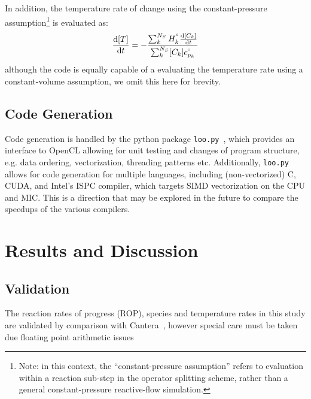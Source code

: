 \documentclass[12pt]{ussci}
\begin{document}
In addition, the temperature rate of change using the constant-pressure assumption\footnote{Note: in this context, the ``constant-pressure assumption'' refers to evaluation within a reaction sub-step in the operator splitting scheme, rather than a general constant-pressure reactive-flow simulation.} is evaluated as:
\begin{equation}
\frac{\text{d}[T]}{\text{d}t} = -\frac{\sum_{k}^{N_S} H^{\degree}_k \frac{\text{d}[C_k]}{\text{d}t}}{\sum_{k}^{N_S} [C_k] c_{p_k}^{\degree}}
\end{equation}
although the code is equally capable of a evaluating the temperature rate using a constant-volume assumption, we omit this here for brevity.

\subsection{Code Generation}
Code generation is handled by the python package \texttt{loo.py}~\cite{kloeckner_loopy_2014}, which provides an interface to OpenCL allowing for unit testing and changes of program structure, e.g. data ordering, vectorization, threading patterns etc.
Additionally, \texttt{loo.py} allows for code generation for multiple languages, including (non-vectorized) C, CUDA, and Intel's ISPC compiler, which targets SIMD vectorization on the CPU and MIC.
This is a direction that may be explored in the future to compare the speedups of the various compilers.



\section{Results and Discussion}
\subsection{Validation}
The reaction rates of progress (ROP), species and temperature rates in this study are validated by comparison with Cantera~\cite{Cantera}, however special care must be taken due floating point arithmetic issues
\end{document}
